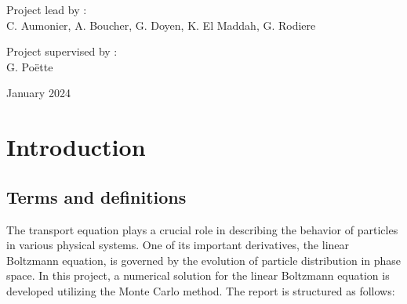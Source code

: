 \documentclass[a4paper, 11pt]{article}
\begin{document}
\begin{titlepage}
		\bigskip
		\bigskip
		
		\centering
		\Large{Project lead by :} \\
		\Large{C. Aumonier, A. Boucher, G. Doyen, K. El Maddah, G. Rodiere}
		
		
		\vfill\vfill\vfill %
		{\Large  Project supervised by :}\\
		\Large{G. Poëtte}
		
		\vspace{0,5cm}
		
		{\large January 2024} %
		
		
		
		
		\vfill %
		
	\end{titlepage}
	
\tableofcontents

\newpage
	
\section{Introduction}



\subsection{Terms and definitions}

The transport equation plays a crucial role in describing the behavior of particles in various physical systems. One of its important derivatives, the linear Boltzmann equation, is governed by the evolution of particle distribution in phase space. In this project, a numerical solution for the linear Boltzmann equation is developed utilizing the Monte Carlo method. The report is structured as follows:
\end{document}
